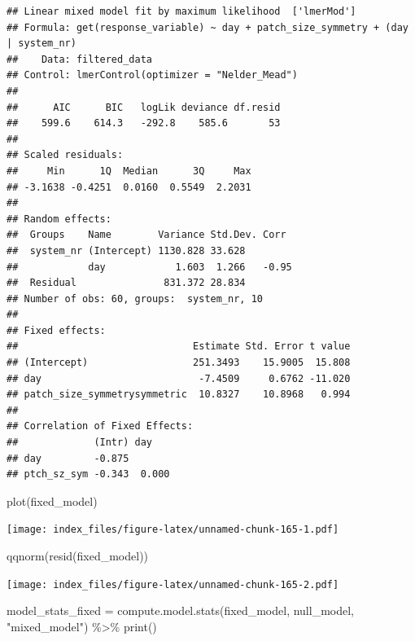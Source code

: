 \documentclass[
]{article}
\newenvironment{Shaded}{\begin{snugshade}}{\end{snugshade}}
\newcommand{\FunctionTok}[1]{\textcolor[rgb]{0.00,0.00,0.00}{#1}}
\newcommand{\NormalTok}[1]{#1}
\newcommand{\OtherTok}[1]{\textcolor[rgb]{0.56,0.35,0.01}{#1}}
\newcommand{\SpecialCharTok}[1]{\textcolor[rgb]{0.00,0.00,0.00}{#1}}
\newcommand{\StringTok}[1]{\textcolor[rgb]{0.31,0.60,0.02}{#1}}
\begin{document}
\begin{verbatim}
## Linear mixed model fit by maximum likelihood  ['lmerMod']
## Formula: get(response_variable) ~ day + patch_size_symmetry + (day | system_nr)
##    Data: filtered_data
## Control: lmerControl(optimizer = "Nelder_Mead")
## 
##      AIC      BIC   logLik deviance df.resid 
##    599.6    614.3   -292.8    585.6       53 
## 
## Scaled residuals: 
##     Min      1Q  Median      3Q     Max 
## -3.1638 -0.4251  0.0160  0.5549  2.2031 
## 
## Random effects:
##  Groups    Name        Variance Std.Dev. Corr 
##  system_nr (Intercept) 1130.828 33.628        
##            day            1.603  1.266   -0.95
##  Residual               831.372 28.834        
## Number of obs: 60, groups:  system_nr, 10
## 
## Fixed effects:
##                              Estimate Std. Error t value
## (Intercept)                  251.3493    15.9005  15.808
## day                           -7.4509     0.6762 -11.020
## patch_size_symmetrysymmetric  10.8327    10.8968   0.994
## 
## Correlation of Fixed Effects:
##             (Intr) day   
## day         -0.875       
## ptch_sz_sym -0.343  0.000
\end{verbatim}

\begin{Shaded}
\begin{Highlighting}[]
\FunctionTok{plot}\NormalTok{(fixed\_model)}
\end{Highlighting}
\end{Shaded}

\texttt{[image: index\_files/figure-latex/unnamed-chunk-165-1.pdf]}

\begin{Shaded}
\begin{Highlighting}[]
\FunctionTok{qqnorm}\NormalTok{(}\FunctionTok{resid}\NormalTok{(fixed\_model))}
\end{Highlighting}
\end{Shaded}

\texttt{[image: index\_files/figure-latex/unnamed-chunk-165-2.pdf]}

\begin{Shaded}
\begin{Highlighting}[]
\NormalTok{model\_stats\_fixed }\OtherTok{=} \FunctionTok{compute.model.stats}\NormalTok{(fixed\_model,}
\NormalTok{                                              null\_model,}
                                              \StringTok{"mixed\_model"}\NormalTok{) }\SpecialCharTok{\%\textgreater{}\%}
  \FunctionTok{print}\NormalTok{()}
\end{Highlighting}
\end{Shaded}
\end{document}
